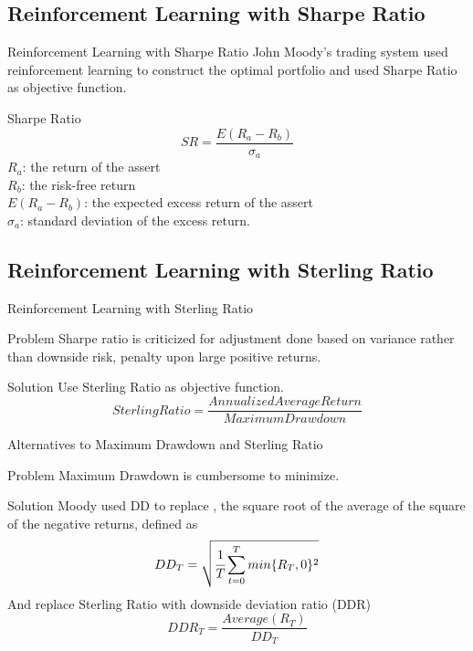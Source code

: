 \subsection{Reinforcement Learning with Sharpe Ratio}
\begin{frame}{Reinforcement Learning with Sharpe Ratio}
John Moody's trading system used reinforcement learning to construct the optimal portfolio and used Sharpe Ratio as objective function.

\begin{block}{Sharpe Ratio}
\[ SR = \frac{E(R_a - R_b)}{\sigma_a}\]
\(R_a\): the return of the assert
\\
\(R_b\): the risk-free return
\\
\(E(R_a - R_b)\): the expected excess return of the assert
\\
\(\sigma_a\): standard deviation of the excess return.
\end{block}
\end{frame}



\subsection{Reinforcement Learning with Sterling Ratio}
\begin{frame}{Reinforcement Learning with Sterling Ratio}
\begin{block}{Problem}
Sharpe ratio is criticized for adjustment done based on variance rather than downside risk, \alert {penalty upon large positive returns}.
\end{block}
\begin{block}{Solution}
Use Sterling Ratio as objective function.
\[
Sterling Ratio=\frac{Annualized Average Return}{Maximum Drawdown}
\]
\end{block}

\end{frame}

\begin{frame}{Alternatives to Maximum Drawdown and  Sterling Ratio}
\begin{block}{Problem}
Maximum Drawdown is cumbersome to minimize.
\end{block}

\begin{block}{Solution}
Moody used DD to replace , the square root of the average of the
square of the negative returns, defined as
\[
DD_T = \sqrt{\cfrac{1}{T}\sum_{t=0}^{T}{min\{R_T,0\}^2}}
\]
And replace Sterling Ratio with downside deviation ratio (DDR)
\[
DDR_T = \frac{Average(R_T)}{DD_T}
\]
\end{block}
\end{frame}




